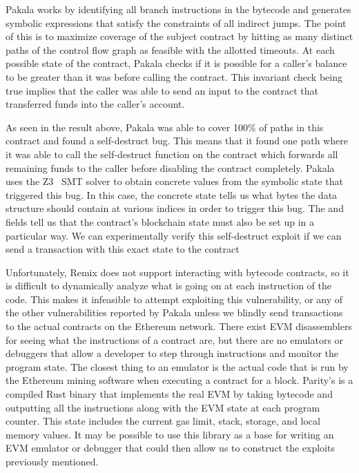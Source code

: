 Pakala works by identifying all branch instructions in the bytecode and generates symbolic expressions that satisfy the constraints of all indirect jumps.
The point of this is to maximize coverage of the subject contract by hitting as many distinct paths of the control flow graph as feasible with the allotted timeouts.
At each possible state of the contract, Pakala checks if it is possible for a caller's balance to be greater than it was before calling the contract.
This invariant check being true implies that the caller was able to send an input to the contract that transferred funds into the caller's account.

As seen in the result above, Pakala was able to cover 100\% of paths in this contract and found a self-destruct bug.
This means that it found one path where it was able to call the self-destruct function on the contract which forwards all remaining funds to the caller before disabling the contract completely.
Pakala uses the Z3~\cite{z3} SMT solver to obtain concrete values from the symbolic state that triggered this bug.
In this case, the concrete state tells us what bytes the  data structure should contain at various indices in order to trigger this bug.
The  and  fields tell us that the contract's blockchain state must also be set up in a particular way.
We can experimentally verify this self-destruct exploit if we can send a transaction with this exact state to the contract

Unfortunately, Remix does not support interacting with bytecode contracts, so it is difficult to dynamically analyze what is going on at each instruction of the code.
This makes it infeasible to attempt exploiting this vulnerability, or any of the other vulnerabilities reported by Pakala unless we blindly send transactions to the actual contracts on the Ethereum network.
There exist EVM disassemblers for seeing what the instructions of a contract are, but there are no emulators or debuggers that allow a developer to step through instructions and monitor the program state.
The closest thing to an emulator is the actual code that is run by the Ethereum mining software when executing a contract for a block.
Parity's  is a compiled Rust binary that implements the real EVM by taking bytecode and outputting all the instructions along with the EVM state at each program counter.
This state includes the current gas limit, stack, storage, and local memory values.
It may be possible to use this  library as a base for writing an EVM emulator or debugger that could then allow us to construct the exploits previously mentioned.






